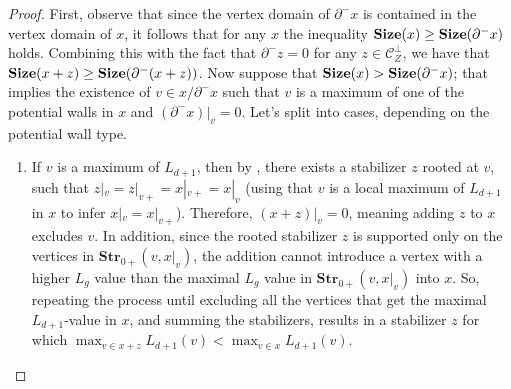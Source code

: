 \begin{proof}
  First, observe that since the vertex domain of $\partial^{-} x$ is contained in the vertex domain of $x$, it follows that for any $x$ the inequality $\mathbf{Size}(x) \ge \mathbf{Size}(\partial^{-} x)$ holds. Combining this with the fact that $\partial^{-} z = 0$ for any $z \in \mathcal{C}_{Z}^{\perp}$, we have that $\mathbf{Size}(x + z) \ge \mathbf{Size}(\partial^{-}(x + z))$. Now suppose that $\mathbf{Size}(x) > \mathbf{Size}(\partial^{-} x)$; that implies the existence of $v \in x/\partial^{-} x$ such that $v$ is a maximum of one of the potential walls in $x$ and $(\partial^{-} x)|_{v} = 0$. Let's split into cases, depending on the potential wall type.
 
  \begin{enumerate}

    \item If $v$ is a maximum of $L_{d+1}$, then by , there exists a stabilizer $z$ rooted at $v$, such that $z|_{v}=z|_{v+}=x|_{v+}=x|_{v}$ (using that $v$ is a local maximum of $L_{d+1}$ in $x$ to infer $x|_{v}=x|_{v+}$). Therefore, $(x+z)|_{v} = 0$, meaning adding $z$ to $x$ excludes $v$. In addition, since the rooted stabilizer $z$ is supported only on the vertices in $\textbf{Str}_{0+}(v,x|_{v})$, the addition cannot introduce a vertex with a higher $L_{g}$ value than the maximal $L_{g}$ value in $\textbf{Str}_{0+}(v,x|_{v})$ into $x$. So, repeating the process until excluding all the vertices that get the maximal $L_{d+1}$-value in $x$, and summing the stabilizers, results in a stabilizer $z$ for which $\max_{v \in x + z}L_{d+1}(v) < \max_{v \in x}L_{d+1}(v)$.



\end{enumerate}
\end{proof}
